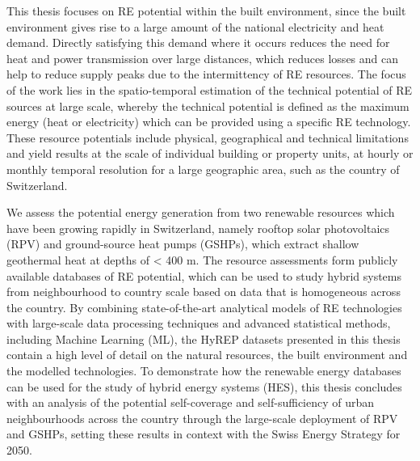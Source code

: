 This thesis focuses on RE potential within the built environment, since the built environment gives rise to a large amount of the national electricity and heat demand. Directly satisfying this demand where it occurs reduces the need for heat and power transmission over large distances, which reduces losses and can help to reduce supply peaks due to the intermittency of RE resources. 
The focus of the work lies in the spatio-temporal estimation of the technical potential of RE sources at large scale, whereby the technical potential is defined as the maximum energy (heat or electricity) which can be provided using a specific RE technology. 
These resource potentials include physical, geographical and technical limitations and yield results at the scale of individual building or property units, at hourly or monthly temporal resolution for a large geographic area, such as the country of Switzerland. 

We assess the potential energy generation from two renewable resources which have been growing rapidly in Switzerland, namely rooftop solar photovoltaics (RPV) and ground-source heat pumps (GSHPs), which extract shallow geothermal heat at depths of < 400 m. 
The resource assessments form publicly available databases of RE potential, which can be used to study hybrid systems from neighbourhood to country scale based on data that is homogeneous across the country. 
By combining state-of-the-art analytical models of RE technologies with large-scale data processing techniques and advanced statistical methods, including Machine Learning (ML), the HyREP datasets presented in this thesis contain a high level of detail on the natural resources, the built environment and the modelled technologies.
To demonstrate how the renewable energy databases can be used for the study of hybrid energy systems (HES), this thesis concludes with an analysis of the potential self-coverage and self-sufficiency of urban neighbourhoods across the country through the large-scale deployment of RPV and GSHPs, setting these results in context with the Swiss Energy Strategy for 2050.


